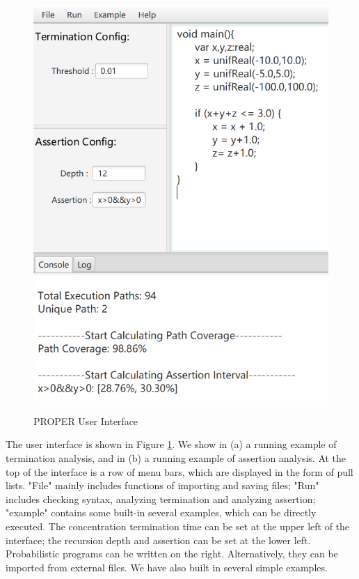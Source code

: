 \documentclass[runningheads]{llncs}
\begin{document}
\begin{figure}[htbp]
{		\includegraphics[scale=0.47]{img/interface2} 
	}
	\caption{PROPER User Interface} %
	\label{interface} %
\end{figure}
The user interface is shown in Figure \ref{interface}. We show in (a) a running example of termination analysis, and in (b) a running example of assertion analysis. At the top of the interface is a row of menu bars, which are displayed in the form of pull lists. "File" mainly includes functions of importing and saving files; "Run" includes checking syntax, analyzing termination and analyzing assertion; "example" contains some built-in several examples, which can be directly executed. The concentration termination time can be set at the upper left of the interface; the recursion depth and assertion can be set at the lower left. Probabilistic programs can be written on the right. Alternatively, they can be  imported from external files. We have also built in several simple examples. %
\end{document}
